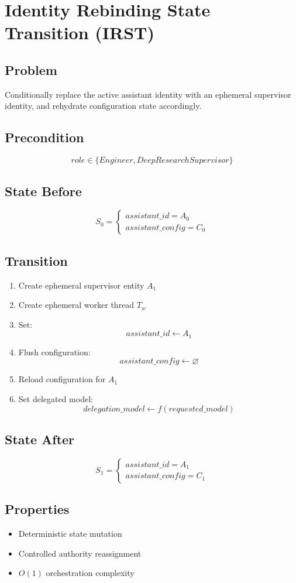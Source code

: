 \section{Identity Rebinding State Transition (IRST)}

\subsection*{Problem}

Conditionally replace the active assistant identity with an ephemeral supervisor identity,
and rehydrate configuration state accordingly.

\subsection*{Precondition}

\[
role \in \{Engineer, DeepResearchSupervisor\}
\]

\subsection*{State Before}

\[
S_0 =
\begin{cases}
assistant\_id = A_0 \\
assistant\_config = C_0
\end{cases}
\]

\subsection*{Transition}

\begin{enumerate}
    \item Create ephemeral supervisor entity $A_1$
    \item Create ephemeral worker thread $T_w$
    \item Set:
    \[
    assistant\_id \leftarrow A_1
    \]
    \item Flush configuration:
    \[
    assistant\_config \leftarrow \varnothing
    \]
    \item Reload configuration for $A_1$
    \item Set delegated model:
    \[
    delegation\_model \leftarrow f(requested\_model)
    \]
\end{enumerate}

\subsection*{State After}

\[
S_1 =
\begin{cases}
assistant\_id = A_1 \\
assistant\_config = C_1
\end{cases}
\]

\subsection*{Properties}

\begin{itemize}
    \item Deterministic state mutation
    \item Controlled authority reassignment
    \item $O(1)$ orchestration complexity
\end{itemize}